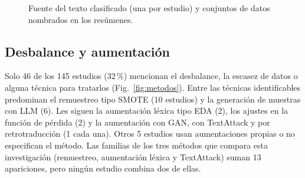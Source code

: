 \documentclass[conference]{IEEEtran}
\begin{document}
\begin{figure}[!t]
\centering
{}
\caption{Fuente del texto clasificado (una por estudio) y conjuntos de datos nombrados en los resúmenes.}
\label{fig:datos}
\end{figure}

\subsection{Desbalance y aumentación}
Solo 46 de los 145 estudios (32\,\%) mencionan el desbalance, la escasez de datos o alguna técnica para tratarlos (Fig.~\ref{fig:metodos}). Entre las técnicas identificables predominan el remuestreo tipo SMOTE (10 estudios) y la generación de muestras con LLM (6). Les siguen la aumentación léxica tipo EDA (2), los ajustes en la función de pérdida (2) y la aumentación con GAN, con TextAttack y por retrotraducción (1 cada una). Otros 5 estudios usan aumentaciones propias o no especifican el método. Las familias de los tres métodos que compara esta investigación (remuestreo, aumentación léxica y TextAttack) suman 13 apariciones, pero ningún estudio combina dos de ellas.
\end{document}
